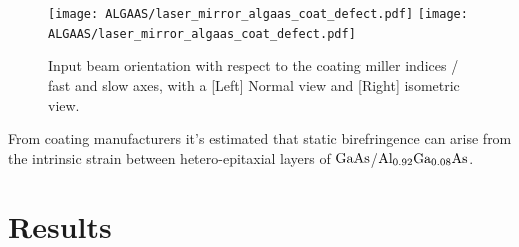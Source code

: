 \begin{figure}[!h]
    \centering
    \begin{subcaptiongroup}
	    \texttt{[image: ALGAAS/laser\_mirror\_algaas\_coat\_defect.pdf]}
	    \label{conormaldefect}
	    \texttt{[image: ALGAAS/laser\_mirror\_algaas\_coat\_defect.pdf]}
	    \label{coisodefect}
    \end{subcaptiongroup}
    \caption{Input beam orientation with respect to the coating miller indices / fast and slow axes, with a [Left] Normal view and [Right] isometric view.}
\end{figure}


From coating manufacturers it's estimated that static birefringence can arise from the intrinsic strain between hetero-epitaxial layers of $\mathrm{GaAs}$/$\mathrm{Al_{0.92}Ga_{0.08}As}$. \cite{cole:2013, adachi:1985}

\section{Results}
